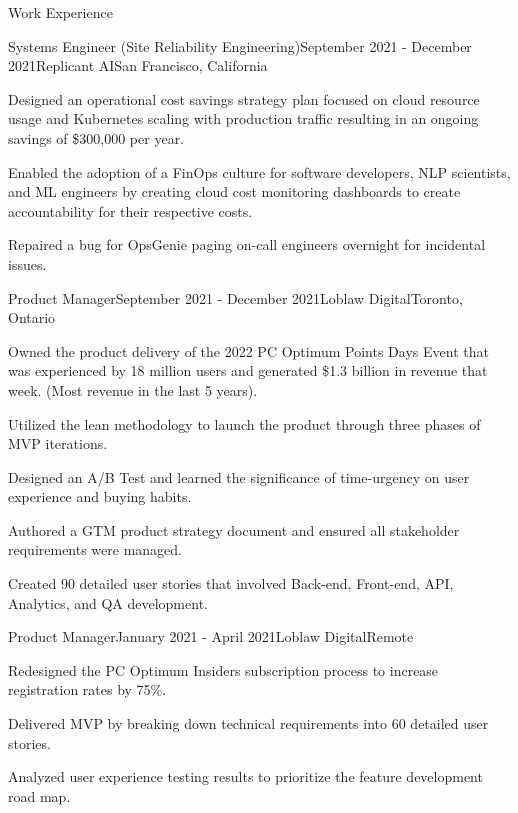\documentclass{resume} %
\begin{document}

\begin{rSection}{Work Experience}

\begin{rSubsection}{Systems Engineer (Site Reliability Engineering)}{September 2021 - December 2021}{Replicant AI}{San Francisco, California}
\item Designed an operational cost savings strategy plan focused on cloud resource usage and Kubernetes scaling with production traffic resulting in an ongoing savings of \$300,000 per year.
\item Enabled the adoption of a FinOps culture for software developers, NLP scientists, and ML engineers by creating cloud cost monitoring dashboards to create accountability for their respective costs.
\item Repaired a bug for OpsGenie paging on-call engineers overnight for incidental issues.
\end{rSubsection}

\begin{rSubsection}{Product Manager}{September 2021 - December 2021}{Loblaw Digital}{Toronto, Ontario}
\item Owned the product delivery of the 2022 PC Optimum Points Days Event that was experienced by 18 million users and generated \$1.3 billion in revenue that week. (Most revenue in the last 5 years).
\item Utilized the lean methodology to launch the product through three phases of MVP iterations. 
\item Designed an A/B Test and learned the significance of time-urgency on user experience and buying habits.
\item Authored a GTM product strategy document and ensured all stakeholder requirements were managed.
\item Created 90 detailed user stories that involved Back-end, Front-end, API, Analytics, and QA development.
\end{rSubsection}


\begin{rSubsection}{Product Manager}{January 2021 - April 2021}{Loblaw Digital}{Remote}
\item Redesigned the PC Optimum Insiders subscription process to increase registration rates by 75\%.
\item Delivered MVP by breaking down technical requirements into 60 detailed user stories.
\item Analyzed user experience testing results to prioritize the feature development road map.
\end{rSubsection}


\end{rSection}
\end{document}
